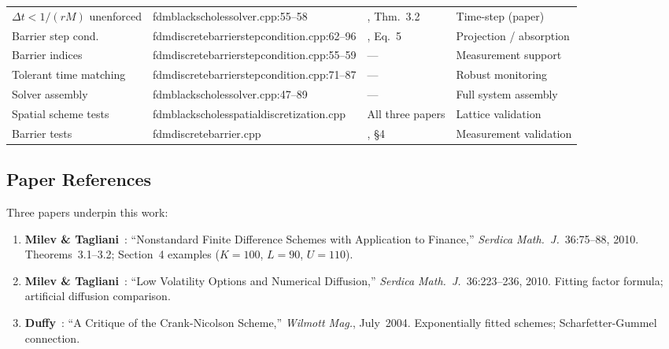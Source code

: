 \begin{table}[!t]
\begin{tabular}{>{\raggedright\arraybackslash}p{3.4cm}>{\raggedright\arraybackslash\ttfamily\scriptsize}p{4.4cm}>{\raggedright\arraybackslash}p{3.2cm}>{\raggedright\arraybackslash}p{3.2cm}}
\rmfamily $\Delta t{<}1/(rM)$ unenforced & fdmblackscholessolver.cpp:55--58  & \rmfamily\cite{MilevTagliani2010a}, Thm.~3.2  & \rmfamily Time-step (paper) \\
\rmfamily Barrier step cond.          & fdmdiscretebarrierstepcondition.cpp:62--96 & \rmfamily\cite{MilevTagliani2010a}, Eq.~5 & \rmfamily Projection / absorption \\
\rmfamily Barrier indices             & fdmdiscretebarrierstepcondition.cpp:55--59 & ---                              & \rmfamily Measurement support \\
\rmfamily Tolerant time matching      & fdmdiscretebarrierstepcondition.cpp:71--87 & ---                              & \rmfamily Robust monitoring \\
\rmfamily Solver assembly             & fdmblackscholessolver.cpp:47--89           & ---                              & \rmfamily Full system assembly \\
\rmfamily Spatial scheme tests        & fdmblackscholes\-spatialdiscretization.cpp & \rmfamily All three papers          & \rmfamily Lattice validation \\
\rmfamily Barrier tests               & fdmdiscretebarrier.cpp                     & \rmfamily\cite{MilevTagliani2010a}, \S4 & \rmfamily Measurement validation \\
\bottomrule
\end{tabular}
\end{table}

\subsection{Paper References}

Three papers underpin this work:
\begin{enumerate}
  \item \textbf{Milev \& Tagliani}~\cite{MilevTagliani2010a}: ``Nonstandard Finite Difference Schemes with Application to Finance,'' \emph{Serdica Math.\ J.}\ 36:75--88, 2010.  Theorems~3.1--3.2; Section~4 examples ($K{=}100$, $L{=}90$, $U{=}110$).
  \item \textbf{Milev \& Tagliani}~\cite{MilevTagliani2010b}: ``Low Volatility Options and Numerical Diffusion,'' \emph{Serdica Math.\ J.}\ 36:223--236, 2010.  Fitting factor formula; artificial diffusion comparison.
  \item \textbf{Duffy}~\cite{Duffy2004}: ``A Critique of the Crank-Nicolson Scheme,'' \emph{Wilmott Mag.}, July~2004.  Exponentially fitted schemes; Scharfetter-Gummel connection.
\end{enumerate}

